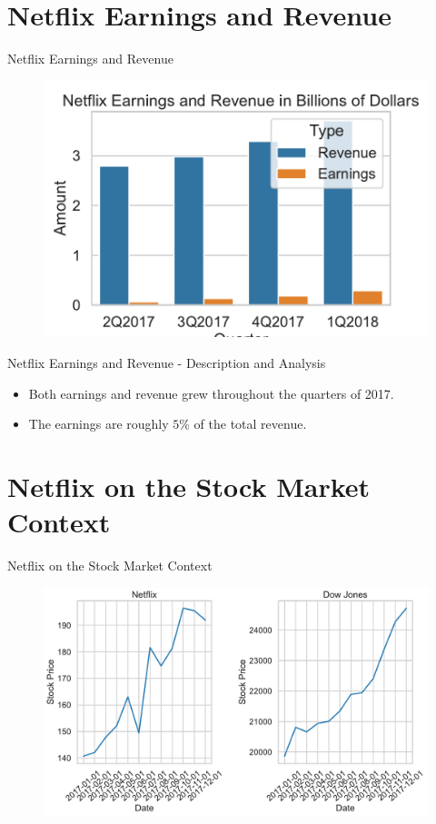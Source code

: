 \documentclass{beamer}
\begin{document}
\section{Netflix Earnings and Revenue}
\begin{frame}{Netflix Earnings and Revenue}
	\begin{figure}
		\centering
		\includegraphics[width=\textwidth]{3-netflix_earnings_and_revenue.pdf}
	\end{figure}
\end{frame}

\begin{frame}{Netflix Earnings and Revenue - Description and Analysis}
	\begin{itemize}
		\item Both earnings and revenue grew throughout the quarters of 2017.
		\item The earnings are roughly $5\%$ of the total revenue.
	\end{itemize}
\end{frame}

\section{Netflix on the Stock Market Context}
\begin{frame}{Netflix on the Stock Market Context}
	\begin{figure}
		\centering
		\includegraphics[width=\textwidth]{4-netflix_and_dow_jones.pdf}
	\end{figure}
\end{frame}
\end{document}
